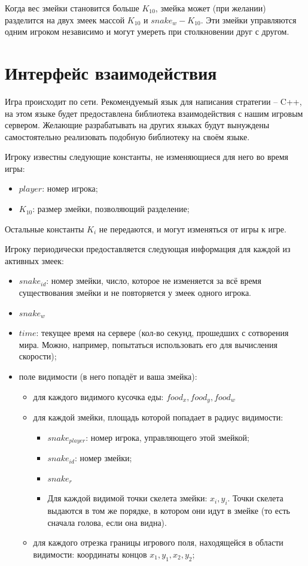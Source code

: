 \documentclass[12pt, a4paper]{article}
\begin{document}
Когда вес змейки становится больше $K_{10}$, змейка может (при желании) разделится на двух змеек массой $K_{10}$ и $snake_w - K_{10}$. Эти змейки управляются одним игроком независимо и могут умереть при столкновении друг с другом.

{\section{Интерфейс взаимодействия}}

Игра происходит по сети. Рекомендуемый язык для написания стратегии -- C++, на этом языке будет предоставлена библиотека взаимодействия с нашим игровым сервером. Желающие разрабатывать на других языках будут вынуждены самостоятельно реализовать подобную библиотеку на своём языке.

Игроку известны следующие константы, не изменяющиеся для него во время игры:
\begin{itemize}
\item $player$: номер игрока;
\item $K_{10}$: размер змейки, позволяющий разделение;
\end{itemize}

Остальные константы $K_i$ не передаются, и могут изменяться от игры к игре.

Игроку периодически предоставляется следующая информация для каждой из активных змеек:
\begin{itemize}
\item $snake_{id}$: номер змейки, число, которое не изменяется за всё время существования змейки и не повторяется у змеек одного игрока.
\item $snake_w$
\item $time$: текущее время на сервере (кол-во секунд, прошедших с сотворения мира. Можно, например, попытаться использовать его для вычисления скорости);
\item поле видимости (в него попадёт и ваша змейка):
\begin{itemize}
\item для каждого видимого кусочка еды: $food_x, food_y, food_w$
\item для каждой змейки, площадь которой попадает в радиус видимости: 
\begin{itemize}
\item $snake_{player}$: номер игрока, управляющего этой змейкой;
\item $snake_{id}$: номер змейки;
\item $snake_r$
\item Для каждой видимой точки скелета змейки: $x_i, y_i$. Точки скелета выдаются в том же порядке, в котором они идут в змейке (то есть сначала голова, если она видна).
\end{itemize}
\item для каждого отрезка границы игрового поля, находящейся в области видимости: координаты концов $x_1, y_1, x_2, y_2$;
\end{itemize}
\end{itemize}
\end{document}
